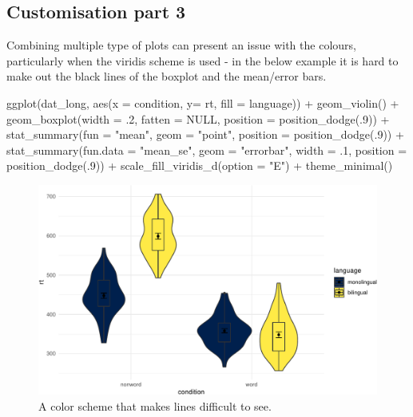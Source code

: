 \documentclass[
  english,
  doc,floatsintext]{apa6}
\newenvironment{Shaded}{\begin{snugshade}}{\end{snugshade}}
\newcommand{\AttributeTok}[1]{\textcolor[rgb]{0.77,0.63,0.00}{#1}}
\newcommand{\ConstantTok}[1]{\textcolor[rgb]{0.00,0.00,0.00}{#1}}
\newcommand{\DecValTok}[1]{\textcolor[rgb]{0.00,0.00,0.81}{#1}}
\newcommand{\FunctionTok}[1]{\textcolor[rgb]{0.00,0.00,0.00}{#1}}
\newcommand{\NormalTok}[1]{#1}
\newcommand{\SpecialCharTok}[1]{\textcolor[rgb]{0.00,0.00,0.00}{#1}}
\newcommand{\StringTok}[1]{\textcolor[rgb]{0.31,0.60,0.02}{#1}}
\begin{document}
\hypertarget{customisation-part-3}{%
\subsection{Customisation part 3}\label{customisation-part-3}}

Combining multiple type of plots can present an issue with the colours, particularly when the viridis scheme is used - in the below example it is hard to make out the black lines of the boxplot and the mean/error bars.

\begin{Shaded}
\begin{Highlighting}[]
\FunctionTok{ggplot}\NormalTok{(dat\_long, }\FunctionTok{aes}\NormalTok{(}\AttributeTok{x =}\NormalTok{ condition, }\AttributeTok{y=}\NormalTok{ rt, }\AttributeTok{fill =}\NormalTok{ language)) }\SpecialCharTok{+}
  \FunctionTok{geom\_violin}\NormalTok{() }\SpecialCharTok{+}
  \FunctionTok{geom\_boxplot}\NormalTok{(}\AttributeTok{width =}\NormalTok{ .}\DecValTok{2}\NormalTok{, }\AttributeTok{fatten =} \ConstantTok{NULL}\NormalTok{, }\AttributeTok{position =} \FunctionTok{position\_dodge}\NormalTok{(.}\DecValTok{9}\NormalTok{)) }\SpecialCharTok{+}
  \FunctionTok{stat\_summary}\NormalTok{(}\AttributeTok{fun =} \StringTok{"mean"}\NormalTok{, }\AttributeTok{geom =} \StringTok{"point"}\NormalTok{, }
               \AttributeTok{position =} \FunctionTok{position\_dodge}\NormalTok{(.}\DecValTok{9}\NormalTok{)) }\SpecialCharTok{+}
  \FunctionTok{stat\_summary}\NormalTok{(}\AttributeTok{fun.data =} \StringTok{"mean\_se"}\NormalTok{, }\AttributeTok{geom =} \StringTok{"errorbar"}\NormalTok{, }\AttributeTok{width =}\NormalTok{ .}\DecValTok{1}\NormalTok{,}
               \AttributeTok{position =} \FunctionTok{position\_dodge}\NormalTok{(.}\DecValTok{9}\NormalTok{)) }\SpecialCharTok{+}
  \FunctionTok{scale\_fill\_viridis\_d}\NormalTok{(}\AttributeTok{option =} \StringTok{"E"}\NormalTok{) }\SpecialCharTok{+}
  \FunctionTok{theme\_minimal}\NormalTok{()}
\end{Highlighting}
\end{Shaded}

\begin{figure}

{\centering \includegraphics[width=1\linewidth]{images/viobox4-1} 

}

\caption{A color scheme that makes lines difficult to see.}\label{fig:viobox4}
\end{figure}
\end{document}

